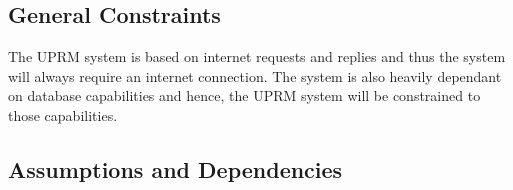 	\subsection{General Constraints}
		The UPRM system is based on internet requests and replies and thus the system will always require an internet connection. The system is also heavily dependant on database capabilities and hence, the UPRM system will be constrained to those capabilities.
	
	\subsection{Assumptions and Dependencies}